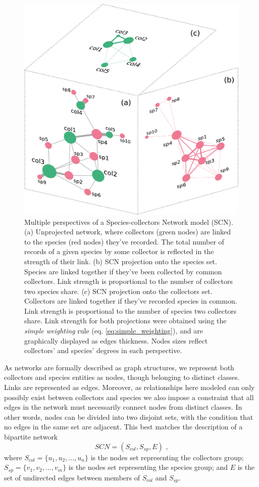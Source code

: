   \begin{figure}[h!]
  	\centering
    \includegraphics[width=.7\linewidth]{figures/network_models/scn_generalaspect.pdf}
    \caption{Multiple perspectives of a Species-collectors Network model (SCN).
    (a) Unprojected network, where collectors (green nodes) are linked to the species (red nodes) they've recorded. The total number of records of a given species by some collector is reflected in the strength of their link. (b) SCN projection onto the species set. Species are linked together if they've been collected by common collectors. Link strength is proportional to the number of collectors two species share. (c) SCN projection onto the collectors set. Collectors are linked together if they've recorded species in common. Link strength is proportional to the number of species two collectors share. 
    Link strength for both projections were obtained using the \textit{simple weighting} rule (eq. \ref{eq:simple_weighting}), and are graphically displayed as edges thickness. Nodes sizes reflect collectors' and species' degrees in each perspective.}
    \label{fig:scn_general}
  \end{figure}
  
As networks are formally described as graph structures, we represent both collectors and species entities as nodes, though belonging to distinct classes.
Links are represented as edges.
Moreover, as relationships here modeled can only possibly exist between collectors and species we also impose a constraint that all edges in the network must necessarily connect nodes from distinct classes. In other words, nodes can be divided into two disjoint sets, with the condition that no edges in the same set are adjacent.
This best matches the description of a bipartite network
$$ SCN = (S_{col},S_{sp},E) \mbox{ ,}$$
where $S_{col} = \{u_1, u_2, ..., u_n \}$ is the nodes set representing the collectors group; $S_{sp}=\{v_1,v_2, ..., v_m\}$ is the nodes set representing the species group; and $E$ is the set of undirected edges between members of $S_{col}$ and $S_{sp}$.

